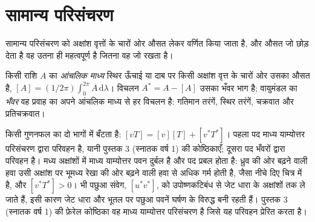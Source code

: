 \section{सामान्य परिसंचरण}\label{sec:b3:atmospheric-dynamics:general-circulation}

सामान्य परिसंचरण को अक्षांश वृत्तों के चारों ओर औसत लेकर वर्णित किया जाता है,
और औसत जो छोड़ देता है वह उतना ही महत्वपूर्ण है जितना वह जो रखता है।

\begin{definition}[आंचलिक माध्य और भँवर]\label{def:b3:atmospheric-dynamics:eddy}
किसी राशि $A$ का \emph{आंचलिक माध्य} स्थिर ऊँचाई या दाब पर
किसी अक्षांश वृत्त के चारों ओर उसका औसत है, $[A] =
(1/2\pi)\int_0^{2\pi} A\,\mathrm d\lambda$। विचलन $A^* = A - [A]$
उसका भँवर भाग है; वायुमंडल का \emph{भँवर} वह
प्रवाह का अपने आंचलिक माध्य से हर विचलन है: गतिमान
तरंगें, स्थिर तरंगें, चक्रवात और प्रतिचक्रवात।
\end{definition}

किसी गुणनफल का  दो भागों में बँटता है: $[vT] = [v][T] + [v^*T^*]$। पहला
पद माध्य याम्योत्तर परिसंचरण द्वारा परिवहन है, यानी
पुस्तक 3 (स्नातक वर्ष 1) की कोष्ठिकाएँ; दूसरा पद भँवरों द्वारा परिवहन है। मध्य
अक्षांशों में माध्य याम्योत्तर पवन दुर्बल है और  पद
प्रबल होता है: ध्रुव की ओर बढ़ने वाली हवा उसी अक्षांश पर भूमध्य रेखा की ओर बढ़ने
वाली हवा से अधिक गर्म होती है, जैसा नीचे दिए चित्र में है, और $[v^*T^*] > 0$।  भी
पछुआ संवेग, $[u^*v^*]$, को उपोष्णकटिबंध से जेट धारा के
अक्षांशों तक ले जाते हैं, इसी कारण जेट धारा और भूतल पर पछुआ पवनें
घर्षण के विरुद्ध बनी रहती हैं। पुस्तक 3 (स्नातक वर्ष 1) की फ़ेरेल कोष्ठिका वह माध्य
याम्योत्तर परिसंचरण है जिसे यह  परिवहन प्रेरित करता है।


